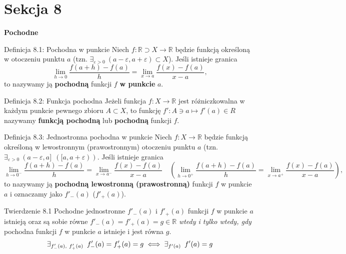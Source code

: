 \documentclass{article}
\newcommand{\hquad}{\mkern9mu}
\newcommand{\R}{\mathbb{R}}
\begin{document}
                                \section*{Sekcja 8} \smallskip
                                {\Huge\bfseries Pochodne} \bigskip \medskip

\begin{defr}{Definicja 8.1: Pochodna w punkcie}
Niech $f:\R\supset X\to\R$ będzie funkcją określoną w otoczeniu punktu $a$
(tzn. $\exists_{\varepsilon>0}\ (a-\varepsilon, a+\varepsilon)\subset X$).
Jeśli istnieje granica
\begin{equation*}
    \lim_{h\to 0}{\frac{f(a+h)-f(a)}{h}}=\lim_{x\to a}{\frac{f(x)-f(a)}{x-a}},
\end{equation*}
to nazywamy ją \textbf{pochodną} funkcji $f$ \textbf{w punkcie} $a$.
\end{defr}

\begin{defr}{Definicja 8.2: Funkcja pochodna}
Jeżeli funkcja $f:X\to\R$ jest różniczkowalna w każdym punkcie pewnego zbioru $A\subset X$, to funkcję
$f':A\ni a\mapsto f'(a)\in R$ nazywamy \textbf{funkcją pochodną} lub \textbf{pochodną} funkcji $f$.
\end{defr}

\begin{defr}{Definicja 8.3: Jednostronna pochodna w punkcie}
Niech $f:X\to\R$ będzie funkcją określoną w lewostronnym (prawostronnym) otoczeniu punktu $a$
(tzn. $\exists_{\varepsilon>0}\ (a-\varepsilon, a]\ \ ([a,a+\varepsilon))$. Jeśli istnieje granica
\begin{equation*}
    \lim_{h\to 0^{-}}{\frac{f(a+h)-f(a)}{h}}=\lim_{x\to a^{-}}{\frac{f(x)-f(a)}{x-a}}\quad
    \left( \lim_{h\to 0^{+}}{\frac{f(a+h)-f(a)}{h}}=\lim_{x\to a^{+}}{\frac{f(x)-f(a)}{x-a}} \right),
\end{equation*}
to nazywamy ją \textbf{pochodną lewostronną (prawostronną)} funkcji $f$ w punkcie $a$ i oznaczamy jako $f'_{-}(a)$
($f'_{+}(a)$).
\end{defr}

\begin{twier}{Twierdzenie 8.1}
Pochodne jednostronne $f'_{-}(a)$ i $f'_{+}(a)$ funkcji $f$ w punkcie $a$ istnieją oraz są sobie równe 
$f'_{-}(a)=f'_{+}(a)=g\in\R$ \textit{wtedy i tylko wtedy, gdy} pochodna funkcji $f$ w punkcie $a$ istnieje i jest równa $g$.
\begin{equation*}
    \exists_{f'_{-}(a),\ f'_{+}(a)}\hquad f'_{-}(a)=f'_{+}(a)=g\iff\exists_{f'(a)}\hquad f'(a)=g
\end{equation*}
\end{twier}
\end{document}

